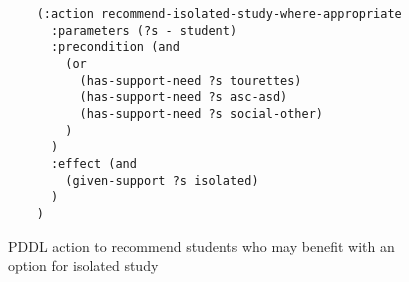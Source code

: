 \begin{figure}[t]
    \begin{lstlisting}
    (:action recommend-isolated-study-where-appropriate
      :parameters (?s - student)
      :precondition (and 
        (or
          (has-support-need ?s tourettes)
          (has-support-need ?s asc-asd)
          (has-support-need ?s social-other)
        )
      )
      :effect (and 
        (given-support ?s isolated)
      )
    )
    \end{lstlisting}
    \caption{PDDL action to recommend students who may benefit with an option for isolated study}\label{fig:pddl-action-isolated-study}
\end{figure}